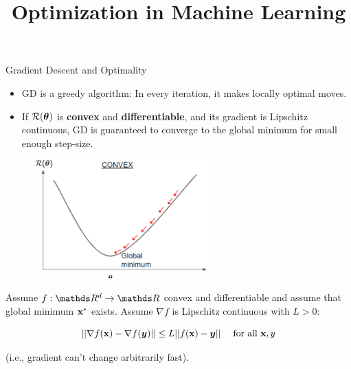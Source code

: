 \documentclass[11pt,compress,t,notes=noshow, xcolor=table]{beamer}
\title{Optimization in Machine Learning}
\date{}
\begin{document}
\sloppy
	
	\begin{vbframe}{Gradient Descent and Optimality}
	
	\begin{itemize}
		\item GD is a greedy algorithm: In every iteration, it makes locally optimal moves.
		\vspace*{0.5mm}
		\item If $\mathcal{R}(\bm{\theta})$ is \textbf{convex} and \textbf{differentiable}, and its gradient is Lipschitz continuous, GD is guaranteed to converge to the global minimum for small enough step-size.  
	\end{itemize}
	
	\begin{figure}
		\centering
		\includegraphics[width=0.6\textwidth]{figure_man/gdes_1.png}
	\end{figure}



\framebreak
	
	Assume $f: \R^d \rightarrow \R$ convex and differentiable and assume that global minimum $\mathbf{x}^\ast$ exists. Assume $\nabla f$ is Lipschitz continuous with $L > 0$: 

	\begin{equation*}
	|| \nabla f(\mathbf{x}) - \nabla f(\bm{y}) || \le L ||f(\mathbf{x}) - \bm{y} || \quad \text{ for all } \mathbf{x}, y
	\end{equation*}
	
	(i.e., gradient can't change arbitrarily fast).
		

\end{vbframe}
\end{document}
